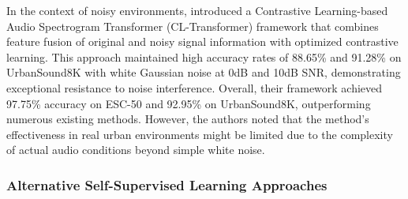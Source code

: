 \documentclass[11pt]{article}
\begin{document}
In the context of noisy environments, \citep{app14219711} introduced a Contrastive Learning-based Audio Spectrogram Transformer (CL-Transformer) framework that combines feature fusion of original and noisy signal information with optimized contrastive learning. This approach maintained high accuracy rates of 88.65\% and 91.28\% on UrbanSound8K with white Gaussian noise at 0dB and 10dB SNR, demonstrating exceptional resistance to noise interference. Overall, their framework achieved 97.75\% accuracy on ESC-50 and 92.95\% on UrbanSound8K, outperforming numerous existing methods. However, the authors noted that the method's effectiveness in real urban environments might be limited due to the complexity of actual audio conditions beyond simple white noise.

\subsubsection{Alternative Self-Supervised Learning Approaches}
\end{document}
